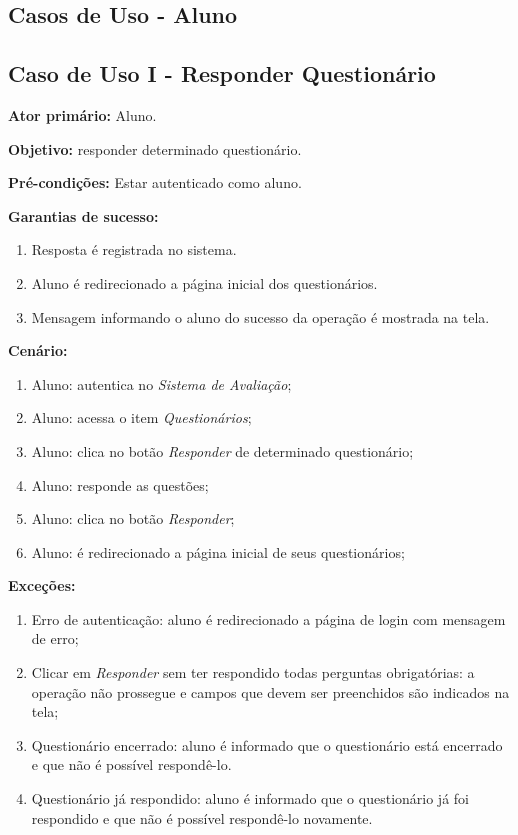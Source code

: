 \documentclass[
  12pt,       %
  openright,      %
  oneside,      %
  a4paper,      %
  english,      %
  french,        %
  spanish,     %
  brazil        %
  ]{abntex2-decsi}
\begin{document}
\begin{apendicesenv}
\chapter{Casos de Uso - Aluno}

\section{Caso de Uso I - Responder Questionário}
    
	\textbf{Ator primário:} Aluno.
				
    \textbf{Objetivo:} responder determinado questionário.
    
	\textbf{Pré-condições:} Estar autenticado como aluno.
		
	\textbf{Garantias de sucesso:} 
        
            \begin{enumerate}
            
            \item Resposta é registrada no sistema.  
            \item Aluno é redirecionado a página inicial dos questionários.
            \item Mensagem informando o aluno do sucesso da operação é mostrada na tela.
            
            \end{enumerate}
        
		\textbf{Cenário:}
		
		\begin{enumerate}
			\item Aluno: autentica no \textit{Sistema de Avaliação};           
			\item Aluno: acessa o item \textit{Questionários};
            \item Aluno: clica no botão \textit{Responder} de determinado questionário;
			\item Aluno: responde as questões;
			\item Aluno: clica no botão \textit{Responder};
            \item Aluno: é redirecionado a página inicial de seus questionários;
		\end{enumerate}
		
		\textbf{Exceções:}
		
			\begin{enumerate}	
				\item Erro de autenticação: aluno é redirecionado a página de login com mensagem de erro;
				\item Clicar em \textit{Responder} sem ter respondido todas perguntas obrigatórias: a operação não prossegue e campos que devem ser preenchidos são indicados na tela;
                \item Questionário encerrado: aluno é informado que o questionário está encerrado e que não é possível respondê-lo.
                \item Questionário já respondido: aluno é informado que o questionário já foi respondido e que não é possível respondê-lo novamente.
			\end{enumerate}


\end{apendicesenv}
\end{document}
